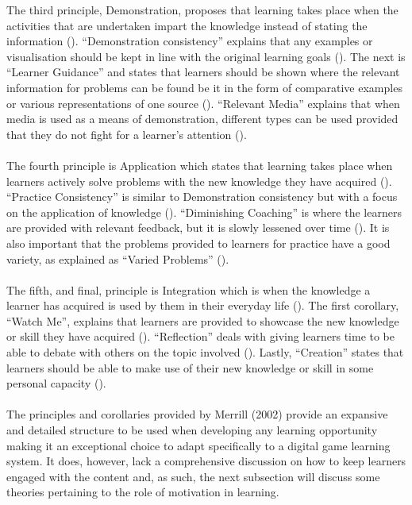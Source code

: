 \noindent The third principle, Demonstration, proposes that learning takes place when the activities that are undertaken impart the knowledge instead of stating the information (\cite{Merrill2002}). “Demonstration consistency” explains that any examples or visualisation should be kept in line with the original learning goals (\cite{Merrill2002}). The next is “Learner Guidance” and states that learners should be shown where the relevant information for problems can be found be it in the form of comparative examples or various representations of one source (\cite{Merrill2002}). “Relevant Media” explains that when media is used as a means of demonstration, different types can be used provided that they do not fight for a learner’s attention (\cite{Merrill2002}).
\\\\
The fourth principle is Application which states that learning takes place when learners actively solve problems with the new knowledge they have acquired (\cite{Merrill2002}). “Practice Consistency” is similar to Demonstration consistency but with a focus on the application of knowledge (\cite{Merrill2002}). “Diminishing Coaching” is where the learners are provided with relevant feedback, but it is slowly lessened over time (\cite{Merrill2002}). It is also important that the problems provided to learners for practice have a good variety, as explained as “Varied Problems” (\cite{Merrill2002}).
\\\\
The fifth, and final, principle is Integration which is when the knowledge a learner has acquired is used by them in their everyday life (\cite{Merrill2002}). The first corollary, “Watch Me”, explains that learners are provided to showcase the new knowledge or skill they have acquired (\cite{Merrill2002}). “Reflection” deals with giving learners time to be able to debate with others on the topic involved (\cite{Merrill2002}). Lastly, “Creation” states that learners should be able to make use of their new knowledge or skill in some personal capacity (\cite{Merrill2002}).
\\\\
The principles and corollaries provided by Merrill (2002) provide an expansive and detailed structure to be used when developing any learning opportunity making it an exceptional choice to adapt specifically to a digital game learning system.  It does, however, lack a comprehensive discussion on how to keep learners engaged with the content and, as such, the next subsection will discuss some theories pertaining to the role of motivation in learning.

